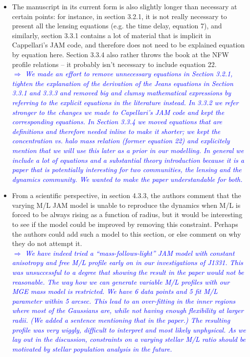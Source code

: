 \documentclass[10pt,a4paper]{article}
\newcommand{\Comment}[1]{\textsl{\textcolor{Blue}{$\Longrightarrow$ {#1}}}}
\begin{document}
\begin{itemize}
\item The manuscript in its current form is also slightly longer than necessary at certain
points: for instance, in section 3.2.1, it is not really necessary to present all
the lensing equations (e.g. the time delay, equation 7), and similarly, section
3.3.1 contains a lot of material that is implicit in Cappellari's JAM code, and
therefore does not need to be explained equation by equation here. Section 3.3.4
also rather throws the book at the NFW profile relations – it probably isn't
necessary to include equation 22. \\\Comment{We made an effort to remove unnecessary equations in Section 3.2.1, tighten the explanation of the derivation of the Jeans equations in Section 3.3.1 and 3.3.3 and removed big and clumsy mathematical expressions by referring to the explicit equations in the literature instead. In 3.3.2 we refer stronger to the changes we made to Capellari's JAM code and kept the corresponding equations. In Section 3.3.4 we moved equations that are definitions and therefore needed inline to make it shorter; we kept the concentration vs. halo mass relation (former equation 22) and explicitely mention that we will use this later as a prior in our modelling. In general we include a lot of equations and a substantial theory introduction because it is a paper that is potentially interesting for two communities, the lensing and the dynamics community. We wanted to make the paper understandable for both.}

\item From a scientific perspective, in section 4.3.3, the authors comment that the
varying M/L JAM model is unable to reproduce the dynamics when M/L is forced to be
always rising as a function of radius, but it would be interesting to see if the
model could be improved by removing this constraint. Perhaps the authors could add
such a model to this section, or else comment on why they do not attempt it. \\\Comment{We have indeed tried a ``mass-follows-light'' JAM model with constant anisotropy and free M/L profile early on in our investigations of J1331. This was unsuccessful to a degree that showing the result in the paper would not be reasonable.  The way how we can generate variable M/L profiles with our MGE mass model is restricted. We have 6 data points and 5 fit M/L parameter within 5 arcsec. This lead to an over-fitting in the inner regions where most of the Gaussians are, while not having enough flexibility at larger radii. (We added a sentence mentioning that in the paper.) The resulting profile was very wiggly, difficult to interpret and most likely unphysical.  As we lay out in the discussion, constraints on a varying stellar M/L ratio should be motivated by stellar population analysis in the future.}


\end{itemize}
\end{document}
